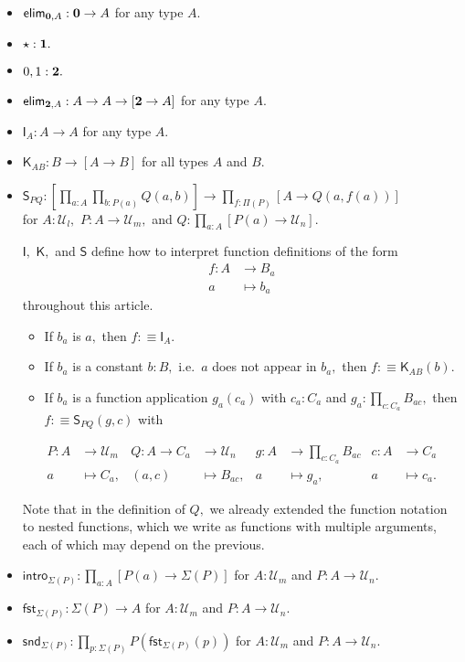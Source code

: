 \documentclass[a4paper]{article}
\theoremstyle{definition}
\theoremstyle{remark}
\let\defeq\equiv
\renewcommand{\equiv}{\simeq}
\newcommand{\univVar}{\mathcal}
\newcommand{\U}{\univVar{U}}
\newcommand{\0}{\primType{0}}
\newcommand{\1}{\primType{1}}
\newcommand{\2}{\primType{2}}
\newcommand{\nm}{\mathsf}
\newcommand{\intro}{\nm{intro}}
\newcommand{\elim}{\nm{elim}}
\newcommand{\fst}{\nm{fst}}
\newcommand{\snd}{\nm{snd}}
\newcommand{\combinator}{\nm}
\newcommand{\idFun}{\combinator{I}}
\newcommand{\constFun}{\combinator{K}}
\newcommand{\revSubstFun}{\combinator{S}}
\begin{document}
\begin{itemize}
  \item $\elim_{\0,A} : \0 \to A$ for any type $A.$

  \item $\star : \1.$

  \item $0,1 : \2.$

  \item $\elim_{\2,A} : A \to A \to [\2 \to A]$ for any type $A.$

  \item $\idFun_A : A \to A$ for any type $A.$

  \item $\constFun_{AB} : B \to [A \to B]$ for all types $A$ and $B.$

  \item $\displaystyle \revSubstFun_{PQ} : \left[\prod_{a : A} \prod_{b : P(a)} Q(a,b)\right] \to \prod_{f : \Pi(P)} [A \to Q(a,f(a))]$\\[1ex]
  for $A : \U_l,$ $P : A \to \U_m,$ and $Q : \prod_{a : A} [P(a) \to \U_n].$

  $\idFun,$ $\constFun,$ and $\revSubstFun$ define how to interpret function definitions of the form
  \begin{align*}
    f : A &\to     B_a\\
        a &\mapsto b_a
  \end{align*}
  throughout this article.
  \begin{itemize}
    \item If $b_a$ is $a,$ then $f :\defeq \idFun_A.$
    \item If $b_a$ is a constant $b : B,$ i.e.\ $a$ does not appear in $b_a,$ then
    $f :\defeq \constFun_{AB}(b).$
    \item If $b_a$ is a function application $g_a(c_a)$ with $c_a : C_a$ and
    $g_a : \prod_{c : C_a} B_{ac},$ then $f :\defeq \revSubstFun_{PQ}(g,c)$ with
  \end{itemize}
  \begin{align*}
    P : A &\to     \U_m & Q : A \to C_a &\to     \U_n   & g : A &\to     \textstyle\prod_{c : C_a} B_{ac} & c : A &\to     C_a\\
        a &\mapsto C_a, &     (a,c)     &\mapsto B_{ac},&     a &\mapsto g_a,                             &     a &\mapsto c_a.
  \end{align*}

  Note that in the definition of $Q,$ we already extended the function notation to nested functions,
  which we write as functions with multiple arguments, each of which may depend on the previous.

  \item $\intro_{\Sigma(P)} : \prod_{a : A} [P(a) \to \Sigma(P)]$ for $A : \U_m$ and $P : A \to \U_n.$

  \item $\fst_{\Sigma(P)} : \Sigma(P) \to A$ for $A : \U_m$ and $P : A \to \U_n.$

  \item $\snd_{\Sigma(P)} : \prod_{p : \Sigma(P)} P(\fst_{\Sigma(P)}(p))$ for $A : \U_m$ and $P : A \to \U_n.$
\end{itemize}
\end{document}
